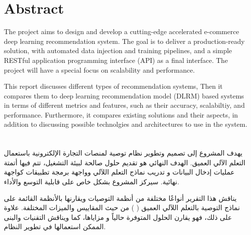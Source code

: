\cleardoublepage {} {} \mtcaddchapter
\chapter*{Abstract}
The project aims to design and develop a cutting-edge accelerated e-commerce deep learning recommendation system. The goal is to deliver a production-ready solution, with automated data injection and training pipelines, and a simple RESTful application programming interface (API) as a final interface. The project will have a special focus on scalability and performance.

This report discusses different types of recommendation systems, Then it compares them to deep learning recommendation model (DLRM) based systems in terms of different metrics and features, such as their accuracy, scalabiltiy, and performance.
Furthermore, it compares existing solutions and their aspects, in addition to discussing possible technolgies and architectures to use in the system.
\cleardoublepage {} {} \mtcaddchapter
\chapter*{}
\begin{RLtext}
يهدف المشروع إلى تصميم وتطوير نظام توصية لمنصات التجارة الإلكترونية باستعمال التعلم الآلي العميق. الهدف النهائي هو تقديم حلول صالحة لبيئة التشغيل، تتم فيها أتمتة عمليات إدخال البيانات و تدريب نماذج التعلم اللآلي وواجهة برمجة تطبيقات 
 كواجهة نهائية. سيركز المشروع بشكل خاص على قابلية التوسع والأداء.

يناقش هذا التقرير أنواعًا مختلفة من أنظمة التوصيات ويقارنها بالأنظمة القائمة على نماذج التوصية بالتعلم اللآلي العميق (
    ) من حيث المقاييس والميزات المختلفة. علاوة على ذلك، فهو يقارن الحلول المتوفرة حالياً و مزاياها، كما ويناقش التقنيات والبنى الممكن استعمالها في تطوير النظام.
\end{RLtext}

\justifying